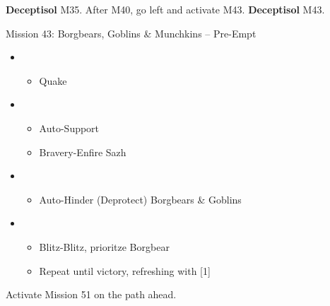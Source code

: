 \textbf{Deceptisol} M35.
After M40, go left and activate M43.
\textbf{Deceptisol} M43.
\vfill
\begin{battle}{{Mission 43: Borgbears, Goblins \& Munchkins -- Pre-Empt}}
	\begin{itemize}
		\item \second
			\begin{itemize}
				\item Quake
			\end{itemize}
		\item \fifth
			\begin{itemize}
				\item Auto-Support
				\item Bravery-Enfire Sazh
			\end{itemize}
		\item \sixth
			\begin{itemize}
				\item Auto-Hinder (Deprotect) Borgbears \& Goblins
			\end{itemize}
		\item \second
			\begin{itemize}
				\item Blitz-Blitz, prioritze Borgbear
				\item Repeat until victory, refreshing with [1]
			\end{itemize}
	\end{itemize}
\end{battle}

Activate Mission 51 on the path ahead.

